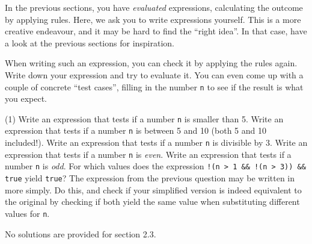 In the previous sections, you have \emph{evaluated} expressions, calculating the outcome by applying rules. Here, we ask you to write expressions yourself. This is a more creative endeavour, and it may be hard to find the ``right idea''. In that case, have a look at the previous sections for inspiration.

When writing such an expression, you can check it by applying the rules again. Write down your expression and try to evaluate it. You can even come up with a couple of concrete ``test cases'', filling in the number \texttt{n} to see if the result is what you expect.

\begin{exercise}
    \begin{longtasks}[resume=true](1)
        \task
        Write an expression that tests if a number \texttt{n} is smaller than 5.
        \task
        Write an expression that tests if a number \texttt{n} is between 5 and 10 (both 5 and 10 included!).
        \task
        Write an expression that tests if a number \texttt{n} is divisible by 3.
        \task
        Write an expression that tests if a number \texttt{n} is \emph{even}.
        \task
        Write an expression that tests if a number \texttt{n} is \emph{odd}.
        \task
        For which values does the expression \texttt{!(n > 1 \&\& !(n > 3)) \&\& true} yield \texttt{true}?
        \task
        The expression from the previous question may be written in more simply. Do this, and check if your simplified version is indeed equivalent to the original by checking if both yield the same value when substituting different values for \texttt{n}.
    \end{longtasks}
\end{exercise}

\begin{solution}
    No solutions are provided for section 2.3.
\end{solution}



